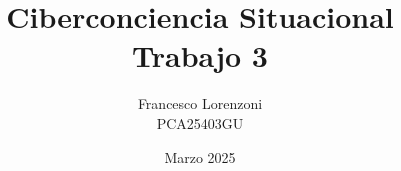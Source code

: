 


\title{Ciberconciencia Situacional\\Trabajo 3}
\author{Francesco Lorenzoni\\\textsc{PCA25403GU}}


\date{Marzo 2025}


\makeatletter
\renewcommand{\l@section}{\@dottedtocline{1}{1.5em}{2.6em}}
\renewcommand{\l@subsection}{\@dottedtocline{2}{2.5em}{3.6em}}
\renewcommand{\l@subsubsection}{\@dottedtocline{3}{3.5em}{4.5em}}
\makeatother
{} %



\doparttoc[n]



\tableofcontents




